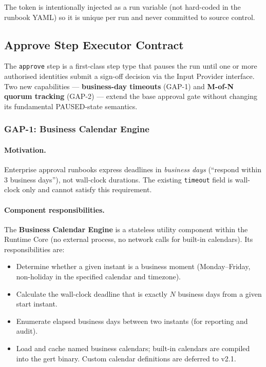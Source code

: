 The token is intentionally injected as a run variable (not hard-coded in the runbook YAML)
so it is unique per run and never committed to source control.

\subsection{Approve Step Executor Contract}
\label{sec:approve_executor_contract}

The \texttt{approve} step is a first-class step type that pauses the run until one or more
authorised identities submit a sign-off decision via the Input Provider interface. Two new
capabilities — \textbf{business-day timeouts} (GAP-1) and \textbf{M-of-N quorum tracking}
(GAP-2) — extend the base approval gate without changing its fundamental PAUSED-state
semantics.

\subsubsection*{GAP-1: Business Calendar Engine}
\label{sec:business_calendar}

\paragraph{Motivation.}
Enterprise approval runbooks express deadlines in \emph{business days} (``respond within
3 business days''), not wall-clock durations. The existing \texttt{timeout} field is
wall-clock only and cannot satisfy this requirement.

\paragraph{Component responsibilities.}
The \textbf{Business Calendar Engine} is a stateless utility component within the Runtime
Core (no external process, no network calls for built-in calendars). Its responsibilities
are:

\begin{itemize}
  \item Determine whether a given instant is a business moment (Monday–Friday,
        non-holiday in the specified calendar and timezone).
  \item Calculate the wall-clock deadline that is exactly $N$ business days from a
        given start instant.
  \item Enumerate elapsed business days between two instants (for reporting and audit).
  \item Load and cache named business calendars; built-in calendars are compiled into
        the gert binary. Custom calendar definitions are deferred to v2.1.
\end{itemize}

